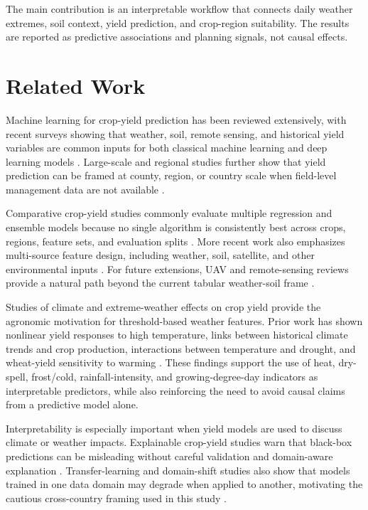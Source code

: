 \documentclass[11pt,a4paper]{article}
\begin{document}
The main contribution is an interpretable workflow that connects daily weather extremes, soil context, yield prediction, and crop-region suitability. The results are reported as predictive associations and planning signals, not causal effects.

\section{Related Work}
Machine learning for crop-yield prediction has been reviewed extensively, with recent surveys showing that weather, soil, remote sensing, and historical yield variables are common inputs for both classical machine learning and deep learning models \citep{vanKlompenburg2020CropYieldReview,Meghraoui2024DLReview,Jabed2024Comprehensive}. Large-scale and regional studies further show that yield prediction can be framed at county, region, or country scale when field-level management data are not available \citep{Paudel2021LargeScaleForecasting,Saadio2022WestAfrica,Sajid2022CountyScale,Dhaliwal2024SweetCorn}.

Comparative crop-yield studies commonly evaluate multiple regression and ensemble models because no single algorithm is consistently best across crops, regions, feature sets, and evaluation splits \citep{Iniyan2023Techniques,Panigrahi2023Comparative,Jhajharia2023MLDL,Mahesh2024Gradient}. More recent work also emphasizes multi-source feature design, including weather, soil, satellite, and other environmental inputs \citep{Bansal2023WinterWheatHeterogeneous,Pathak2023InputModalities,Lu2024MultiSourceDL,Ashfaq2025DeepAgroNet}. For future extensions, UAV and remote-sensing reviews provide a natural path beyond the current tabular weather-soil frame \citep{Yuan2024UAVReview}.

Studies of climate and extreme-weather effects on crop yield provide the agronomic motivation for threshold-based weather features. Prior work has shown nonlinear yield responses to high temperature, links between historical climate trends and crop production, interactions between temperature and drought, and wheat-yield sensitivity to warming \citep{Schlenker2009NonlinearTemperature,Lobell2011ClimateTrends,Matiu2017TemperatureDrought,Tack2015WarmingWheat}. These findings support the use of heat, dry-spell, frost/cold, rainfall-intensity, and growing-degree-day indicators as interpretable predictors, while also reinforcing the need to avoid causal claims from a predictive model alone.

Interpretability is especially important when yield models are used to discuss climate or weather impacts. Explainable crop-yield studies warn that black-box predictions can be misleading without careful validation and domain-aware explanation \citep{Hu2023ExplainableYield,Mohan2025AIXAI}. Transfer-learning and domain-shift studies also show that models trained in one data domain may degrade when applied to another, motivating the cautious cross-country framing used in this study \citep{Joshi2024TransferLearning,Morales2023PastFuture}.
\end{document}
